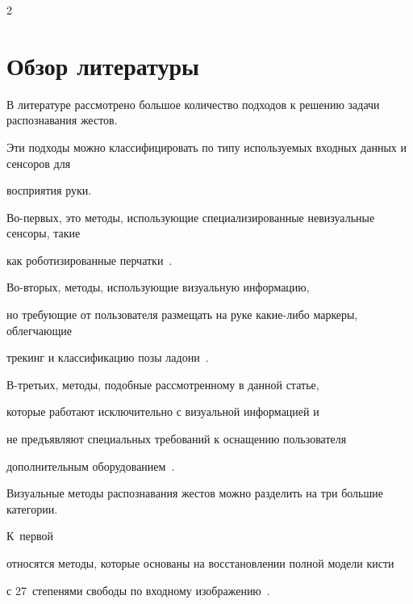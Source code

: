 \begin{multicols}{2}
\vspace*{-6pt}





\section{Обзор литературы}\label{sec:RelatedWork}





В литературе рассмотрено большое количество подходов к решению задачи распознавания жестов.


Эти подходы можно классифицировать по типу используемых входных данных и сенсоров для 


восприятия руки.


Во-пер\-вых, это методы, исполь\-зу\-ющие специализированные невизуальные сенсоры, такие 


как роботизированные перчатки~\cite{GaVeDi}.


Во-вто\-рых, методы, использующие визуальную информацию, 


но требующие от пользователя размещать на руке ка\-кие-ли\-бо маркеры, облегчающие 


трекинг и классификацию позы ладони~\cite{ColorGlove2009}.


В-третьих, методы, подобные рассмотренному в данной статье, 


которые работают исключительно с визуальной информацией и


не предъявляют специальных требований к оснащению пользователя 


дополнительным оборудованием~\cite{VisionBasedReview2009}.








Визуальные методы распознавания жестов можно разделить на три большие категории.


К~первой\linebreak\vspace*{-12pt}





\pagebreak





\noindent


 относятся методы, которые основаны на вос\-ста\-нов\-ле\-нии полной модели кисти 


с 27~степенями свободы по входному изображению~\cite{ArticulatedHandTracking3d}.



\end{multicols}
